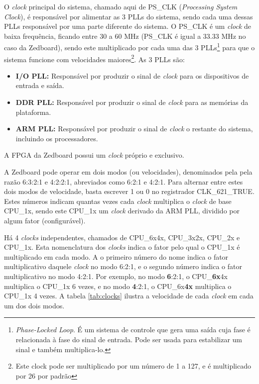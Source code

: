 O \emph{clock} principal do sistema, chamado aqui de PS\_CLK (\emph{Processing System Clock}), é responsável por alimentar as 3 PLLs do sistema, sendo cada uma dessas PLLs responsável por uma parte diferente do sistema\cite[p.~622]{ug585}. O PS\_CLK é um \emph{clock} de baixa frequência, ficando entre 30 a 60 MHz (PS\_CLK é igual a 33.33 MHz no caso da Zedboard), sendo este multiplicado por cada uma das 3 PLLs\footnote{\emph{Phase-Locked Loop}. É um sistema de controle que gera uma saída cuja fase é relacionada à fase do sinal de entrada. Pode ser usada para estabilizar um sinal e também multiplica-lo.} para que o sistema funcione com velocidades maiores\footnote{Este clock pode ser multiplicado por um número de 1 a 127, e é multiplicado por 26 por padrão}. As 3 PLLs são:

\begin{itemize}
	\item \textbf{I/O PLL:} Responsável por produzir o sinal de \emph{clock} para os dispositivos de entrada e saída.
	\item \textbf{DDR PLL:} Responsável por produzir o sinal de \emph{clock} para as memórias da plataforma.
	\item \textbf{ARM PLL:} Responsável por produzir o sinal de \emph{clock} o restante do sistema, incluindo os processadores.
\end{itemize}

A FPGA da Zedboard possui um \emph{clock} próprio e exclusivo.

A Zedboard pode operar em dois modos (ou velocidades), denominados pela pela razão 6:3:2:1 e 4:2:2:1, abreviados como 6:2:1 e 4:2:1. Para alternar entre estes dois modos de velocidade, basta escrever 1 ou 0 no registrador CLK\_621\_TRUE. Estes números indicam quantas vezes cada \emph{clock} multiplica o \emph{clock} de base CPU\_1x, sendo este CPU\_1x um \emph{clock} derivado da ARM PLL, dividido por algum fator (configurável).

Há 4 \emph{clocks} independentes, chamados de CPU\_6x4x, CPU\_3x2x, CPU\_2x e CPU\_1x. Esta nomenclatura dos \emph{clocks} indica o fator pelo qual o CPU\_1x é multiplicado em cada modo.
A o primeiro número do nome indica o fator multiplicativo daquele \emph{clock} no modo 6:2:1, e o segundo número indica o fator multiplicativo no modo 4:2:1.
Por exemplo, no modo \textbf{6}:2:1, o CPU\_\textbf{6x}4x multiplica o CPU\_1x 6 vezes, e no modo \textbf{4}:2:1, o CPU\_6x\textbf{4x} multiplica o CPU\_1x 4 vezes. A tabela \ref{tab:clocks} ilustra a velocidade de cada \emph{clock} em cada um dos dois modos.

